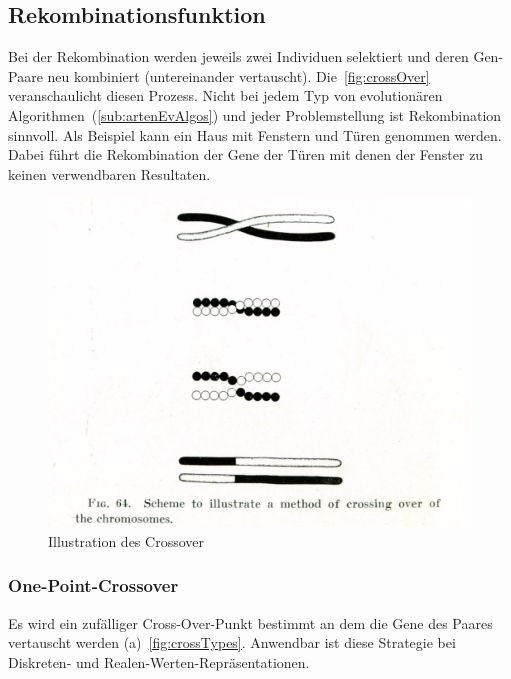     \subsection{Rekombinationsfunktion}

      Bei der Rekombination werden jeweils zwei Individuen selektiert und
      deren Gen-Paare neu kombiniert (untereinander vertauscht).
      Die~\vref{fig:crossOver} veranschaulicht diesen Prozess.
      Nicht bei jedem Typ von evolutionären Algorithmen~(\vref{sub:artenEvAlgos}) und
      jeder Problemstellung ist Rekombination sinnvoll.
      Als Beispiel kann ein Haus mit Fenstern und Türen genommen werden.
      Dabei führt die Rekombination der Gene der Türen mit denen der Fenster zu keinen verwendbaren Resultaten.

      \begin{figure}[H]
        \includegraphics[scale=0.3,center]{graphics/morgan_crossover}
        \caption[\protect{}]{Illustration des Crossover\label{fig:crossOver}}
      \end{figure}

      \subsubsection{One-Point-Crossover}

        Es wird ein zufälliger Cross-Over-Punkt bestimmt an dem die Gene des Paares vertauscht werden (a)~\vref{fig:crossTypes}.
        Anwendbar ist diese Strategie bei Diskreten- und Realen-Werten-Repräsentationen.

